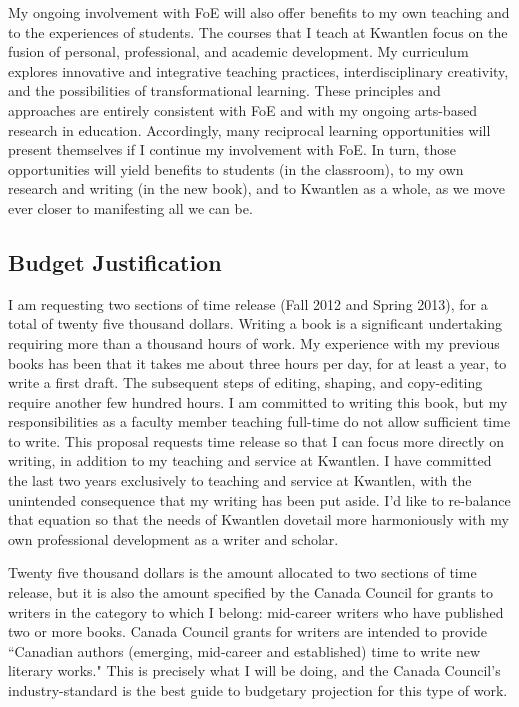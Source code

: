 \documentclass[letterpaper,10pt,headsepline]{scrreprt}
\begin{document}
My ongoing involvement with FoE will also offer benefits to my own teaching and to the experiences of students. The courses that I teach at Kwantlen focus on the fusion of personal, professional, and academic development. My curriculum explores innovative and integrative teaching practices, interdisciplinary creativity, and the possibilities of transformational learning. These principles and approaches are entirely consistent with FoE and with my ongoing arts-based research in education. Accordingly, many reciprocal learning opportunities will present themselves if I continue my involvement with FoE. In turn, those opportunities will yield benefits to students (in the classroom), to my own research and writing (in the new book), and to Kwantlen as a whole, as we move ever closer to manifesting all we can be.

\subsection{Budget Justification}

I am requesting two sections of time release (Fall 2012 and Spring 2013), for a total of twenty five thousand dollars. Writing a book is a significant undertaking requiring more than a thousand hours of work. My experience with my previous books has been that it takes me about three hours per day, for at least a year, to write a first draft. The subsequent steps of editing, shaping, and copy-editing require another few hundred hours. I am committed to writing this book, but my responsibilities as a faculty member teaching full-time do not allow sufficient time to write. This proposal requests time release so that I can focus more directly on writing, in addition to my teaching and service at Kwantlen. I have committed the last two years exclusively to teaching and service at Kwantlen, with the unintended consequence that my writing has been put aside. I'd like to re-balance that equation so that the needs of Kwantlen dovetail more harmoniously with my own professional development as a writer and scholar.

Twenty five thousand dollars is the amount allocated to two sections of time release, but it is also the amount specified by the Canada Council for grants to writers in the category to which I belong: mid-career writers who have published two or more books. Canada Council grants for writers are intended to provide ``Canadian authors (emerging, mid-career and established) time to write new literary works." This is precisely what I will be doing, and the Canada Council's industry-standard is the best guide to budgetary projection for this type of work.
\end{document}
